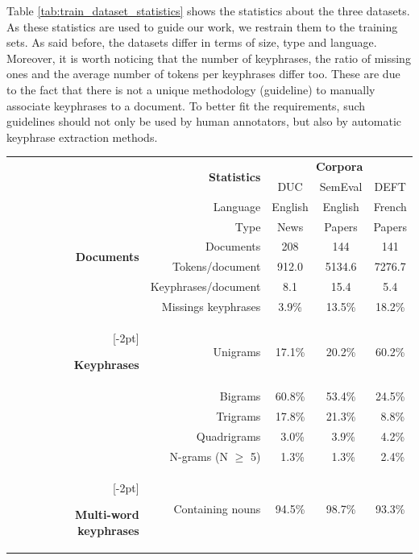     Table \ref{tab:train_dataset_statistics} shows the statistics about the
    three datasets. As these statistics are used to guide our work, we restrain
    them to the training sets. As said before, the datasets differ in terms of
    size, type and language. Moreover, it is worth noticing that the number of
    keyphrases, the ratio of missing ones and the average number of tokens per
    keyphrases differ too. These are due to the fact that there is not a unique
    methodology (guideline) to manually associate keyphrases to a document. To
    better fit the requirements, such guidelines should not only be used by
    human annotators, but also by automatic keyphrase extraction methods.
    \begin{table}
      \centering
      \begin{tabular}{rrccc}
        \toprule
        & \multirow{2}{*}[-2pt]{\textbf{Statistics}} & \multicolumn{3}{c}{\textbf{Corpora}}\\
        \cmidrule{3-5}
        & & DUC & SemEval & DEFT\\
        \midrule
        \multirow{6}{*}[-2pt]{\begin{sideways}\textbf{Documents}\end{sideways}} & Language & English & English & French\\
        & Type & News & Papers & Papers\\
        & Documents & 208 & 144 & 141\\
        & Tokens/document & 912.0 & 5134.6 & 7276.7\\
        & Keyphrases/document & 8.1 & 15.4 & 5.4\\
        & Missings keyphrases & 3.9\% & 13.5\% & 18.2\%\\
        \addlinespace[1.5\defaultaddspace]
        \multirow{5}{*}[-2pt]{\begin{sideways}\textbf{Keyphrases}\end{sideways}} & Unigrams & 17.1\% & 20.2\% & 60.2\%\\
        & Bigrams & 60.8\% & 53.4\% & 24.5\%\\
        & Trigrams & 17.8\% & 21.3\% & $~~$8.8\%\\
        & Quadrigrams & $~~$3.0\% & $~~$3.9\% & $~~$4.2\%\\
        & N-grams (N $\geq$ 5) & $~~$1.3\% & $~~$1.3\% & $~~$2.4\%\\
        \addlinespace[1.5\defaultaddspace]
        \multirow{5}{*}[-2pt]{\begin{sideways}\textbf{Multi-word keyphrases}\end{sideways}} & Containing nouns & 94.5\% & 98.7\% & 93.3\%\\

\end{tabular}
\end{table}
